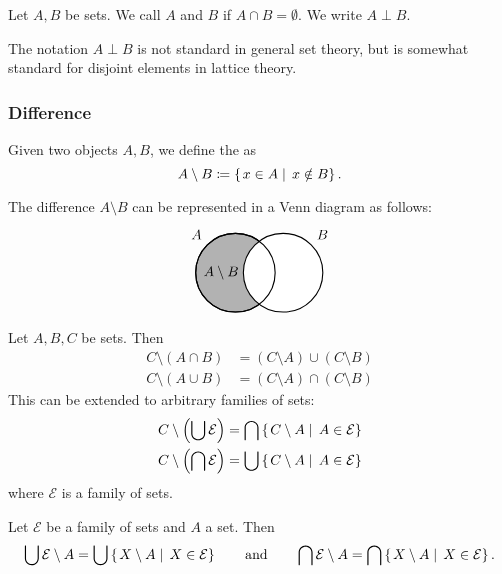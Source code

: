 \begin{definition}
Let $A,B$ be sets. We call $A$ and $B$  if $A\cap B = \emptyset$. We write $A\perp B$.
\end{definition}
The notation $A\perp B$ is not standard in general set theory, but is somewhat standard for disjoint elements in lattice theory.

\subsubsection{Difference}
\begin{definition}
Given two objects $A,B$, we define the  as
\[A\setminus B \coloneqq \left\{\left.  x\in A \;\right|\; x\notin B \right\}. \]
\end{definition}
The difference $A\setminus B$ can be represented in a Venn diagram as follows:
\[ \begin{tikzpicture}[thick,
    set/.style = {circle,
        minimum size = 2cm}]

\node[set,draw,fill=black!30,label={135:$A$}] (A) at (0,0) {};

\node[set,draw,fill=white,label={45:$B$}] (B) at (1.2,0) {};

\draw (0,0) circle(1cm);

\node at (-0.36,0) {$A\setminus B$};
\end{tikzpicture} \]

\begin{proposition}
Let $A,B,C$ be sets. Then
\begin{align*}
C\setminus (A\cap B) &= (C\setminus A)\cup(C\setminus B) \\
C\setminus (A\cup B) &= (C\setminus A)\cap(C\setminus B)
\end{align*}
This can be extended to arbitrary families of sets:
\begin{align*}
C\setminus\left(\bigcup \mathcal{E}\right) &= \bigcap\left\{\left. C\setminus A \;\right|\; A\in\mathcal{E} \right\} \\
C\setminus\left(\bigcap \mathcal{E}\right) &= \bigcup\left\{\left. C\setminus A \;\right|\; A\in\mathcal{E} \right\}
\end{align*}
where $\mathcal{E}$ is a family of sets.
\end{proposition}
\begin{lemma}
Let $\mathcal{E}$ be a family of sets and $A$ a set. Then
\[ \bigcup \mathcal{E} \setminus A = \bigcup\left\{\left. X\setminus A \;\right|\; X\in\mathcal{E} \right\} \qquad\text{and}\qquad \bigcap \mathcal{E} \setminus A = \bigcap\left\{\left. X\setminus A \;\right|\; X\in\mathcal{E} \right\}. \]
\end{lemma}

